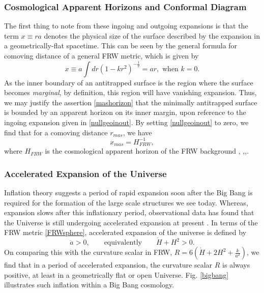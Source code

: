 \subsubsection*{Cosmological Apparent Horizons and Conformal Diagram}
The first thing to note from these ingoing and outgoing expansions is that the term $x\equiv ra$ denotes the physical size of the surface described by the expansion in a geometrically-flat spacetime. This can be seen by the general formula for comoving distance of a general FRW metric, which is given by \cite{Berera:2000xz}
\[
x\equiv a\int dr (1-kr^2)^{-\frac{1}{2}}=ar,\mbox{ when } k=0.
\]
As the inner boundary of an antitrapped surface is the region where the surface becomes \emph{marginal}, by definition, this region will have vanishing expansion. Thus, we may justify the assertion \eqref{mashorizon} that the minimally antitrapped surface is bounded by an apparent horizon on its inner margin, upon reference to the ingoing expansion given in \eqref{nullgeoinout}. By setting \eqref{nullgeoinout} to zero, we find that for a comoving distance $r_{mas}$, we have
\[
x_{mas}=H_{FRW}^{-1}
,\] 
where $H_{FRW}$ is the cosmological apparent horizon of the FRW background \cite{Berera:2000xz}, \cite{Vachaspati:1998dy},\cite{tHooft:2009bh},\cite{d1992approaches}.

\subsubsection*{Accelerated Expansion of the Universe} Inflation theory suggests a period of rapid expansion soon after the  Big Bang is required for the formation of the large scale structures we see today. Whereas, expansion slows after this inflationary period, observational data has found that the Universe is still undergoing accelerated expansion at present \cite{Accel}. In terms of the FRW metric \eqref{FRWsphere}, accelerated expansion of the universe is defined by
\[
\label{acc}
\ddot{a}>0,\qquad\mbox{equivalently}\qquad {\dot H}+H^2>0
.\]
On comparing this with the curvature scalar in FRW, $R=6\left(\dot{H}+2H^2+\frac{k}{a^2}\right)$, we find that in a period of accelerated expansion, the curvature scalar $R$ is always positive, at least in a geometrically flat or open Universe. Fig. \ref{bigbang} illustrates  such inflation within a Big Bang cosmology. 

